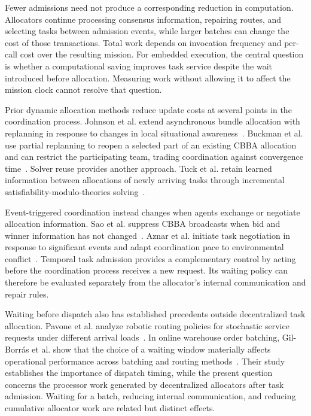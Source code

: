 \documentclass[conference]{IEEEtran}
\begin{document}
Fewer admissions need not produce a corresponding reduction in computation. Allocators continue processing consensus information, repairing routes, and selecting tasks between admission events, while larger batches can change the cost of those transactions. Total work depends on invocation frequency and per-call cost over the resulting mission. For embedded execution, the central question is whether a computational saving improves task service despite the wait introduced before allocation. Measuring work without allowing it to affect the mission clock cannot resolve that question.

Prior dynamic allocation methods reduce update costs at several points in the coordination process. Johnson et al. extend asynchronous bundle allocation with replanning in response to changes in local situational awareness~\cite{johnson2011dynamic}. Buckman et al. use partial replanning to reopen a selected part of an existing CBBA allocation and can restrict the participating team, trading coordination against convergence time~\cite{buckman2019partial}. Solver reuse provides another approach. Tuck et al. retain learned information between allocations of newly arriving tasks through incremental satisfiability-modulo-theories solving~\cite{tuck2024smt}.

Event-triggered coordination instead changes when agents exchange or negotiate allocation information. Sao et al. suppress CBBA broadcasts when bid and winner information has not changed~\cite{sao2025event}. Aznar et al. initiate task negotiation in response to significant events and adapt coordination pace to environmental conflict~\cite{aznar2026event}. Temporal task admission provides a complementary control by acting before the coordination process receives a new request. Its waiting policy can therefore be evaluated separately from the allocator's internal communication and repair rules.

Waiting before dispatch also has established precedents outside decentralized task allocation. Pavone et al. analyze robotic routing policies for stochastic service requests under different arrival loads~\cite{pavone2011adaptive}. In online warehouse order batching, Gil-Borr\'{a}s et al. show that the choice of a waiting window materially affects operational performance across batching and routing methods~\cite{gilborras2024window}. Their study establishes the importance of dispatch timing, while the present question concerns the processor work generated by decentralized allocators after task admission. Waiting for a batch, reducing internal communication, and reducing cumulative allocator work are related but distinct effects.
\end{document}
